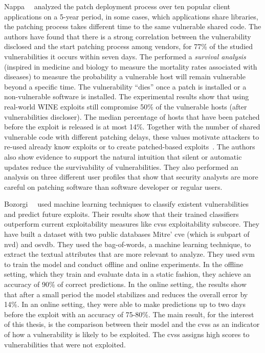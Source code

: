 Nappa~\etal{}~\cite{Nappa:2015} analyzed the patch deployment process over ten popular client applications on a 5-year period, in some cases, which applications share libraries, the patching process takes different time to the same vulnerable shared code. 
The authors have found that there is a strong correlation between the vulnerability disclosed and the start patching process among vendors, for 77\% of the studied vulnerabilities it occurs within seven days. 
The performed a \emph{survival analysis} (inspired in medicine and biology to measure the mortality rates associated with diseases) to measure the probability a vulnerable host will remain vulnerable beyond a specific time.
The vulnerability ``dies'' once a patch is installed or a non-vulnerable software is installed.
The experimental results show that using real-world WINE exploits still compromise 50\% of the vulnerable hosts (after vulnerabilities discloser). 
The median percentage of hosts that have been patched before the exploit is released is at most 14\%.
Together with the number of shared vulnerable code with different patching delays, these values motivate attackers to re-used already know exploits or to create patched-based exploits~\cite{Brumley:2008}.
The authors also show evidence to support the natural intuition that silent or automatic updates reduce the survivability of vulnerabilities. 
They also performed an analysis on three different user profiles that show that security analysts are more careful on patching software than software developer or regular users.


Bozorgi~\etal{}~\cite{Bozorgi:2010} used machine learning techniques to classify existent vulnerabilities and predict future exploits.
Their results show that their trained classifiers outperform current exploitability measures like \gls{cvss} exploitability subscore.
They have built a dataset with two public databases Mitre' \gls{cve} (which is subpart of \gls{nvd}) and \gls{osvdb}.
They used the bag-of-words, a machine learning technique, to extract the textual attributes that are more relevant to analyze.
They used \gls{svm} to train the model and conduct offline and online experiments.
In the offline setting, which they train and evaluate data in a static fashion, they achieve an accuracy of 90\% of correct predictions.
In the online setting, the results show that after a small period the model stabilizes and reduces the overall error by 14\%.
In an online setting, they were able to make predictions up to two days before the exploit with an accuracy of 75-80\%.
The main result, for the interest of this thesis, is the comparison between their model and the \gls{cvss} as an indicator of how a vulnerability is likely to be exploited.
The \gls{cvss} assigns high scores to vulnerabilities that were not exploited. 


